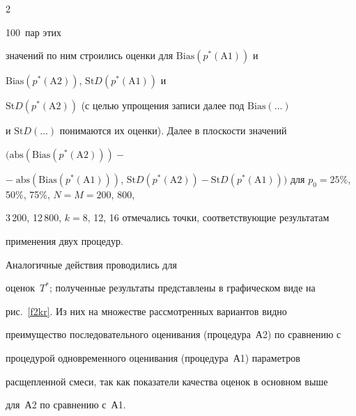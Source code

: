 \begin{multicols}{2}





\noindent


 100~пар этих 


значений по ним строились оценки для $\mathrm{Bias}(p^*(\mathrm{A1}))$ и 


$\mathrm{Bias}(p^*(\mathrm{A2}))$, $\mathrm{St}D(p^*(\mathrm{A1}))$ и 


$\mathrm{St}D(p^*(\mathrm{A2}))$ (с целью упрощения записи далее под $\mathrm{Bias}(\ldots)$ 


и $\mathrm{St}D(\ldots)$ понимаются их оценки). Далее в плоскости значений 


$(\mathrm{abs}(\mathrm{Bias}(p^*(\mathrm{A2}))) -$ %


$-\;\mathrm{abs}(\mathrm{Bias}(p^*(\mathrm{A1})))$, $\mathrm{St}D(p^*(\mathrm{A2})) - 


\mathrm{St}D(p^*(\mathrm{A1})))$ для $p_0 = 25\%$, 50\%, 75\%, $N = M = 200$, 800, 


3\,200, 12\,800, $k = 8$, 12, 16 отмечались точки, соответствующие результатам 


применения двух процедур. 


{%





}





Аналогичные действия проводились для 


оценок~$T^*$; полученные результаты представлены в графическом виде на 


рис.~\ref{f2kr}. Из них на множестве рассмотренных вариантов видно 


преимущество последовательного оценивания (процедура~А2) по сравнению с 


процедурой одновременного оценивания (процедура~А1) параметров %


расщепленной смеси, так как показатели качества оценок в основном выше 


для~А2 по сравнению с~А1.


{%





}









\end{multicols}
